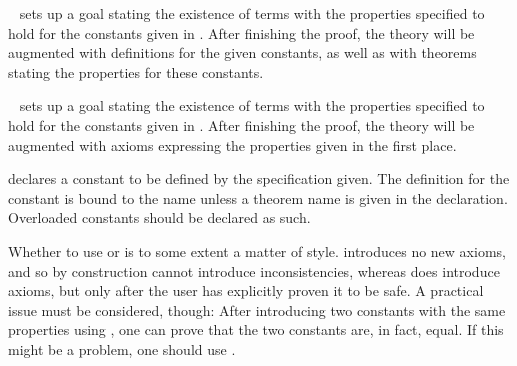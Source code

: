 \begin{isabellebody}
\begin{isamarkuptext}
\begin{description}
  \item \hyperlink{command.HOL.specification}{\mbox{}}~ sets up a
  goal stating the existence of terms with the properties specified to
  hold for the constants given in .  After finishing the
  proof, the theory will be augmented with definitions for the given
  constants, as well as with theorems stating the properties for these
  constants.

  \item \hyperlink{command.HOL.ax-specification}{\mbox{}}~ sets up
  a goal stating the existence of terms with the properties specified
  to hold for the constants given in .  After finishing
  the proof, the theory will be augmented with axioms expressing the
  properties given in the first place.

  \item {} declares a constant to be defined by the
  specification given.  The definition for the constant  is
  bound to the name  unless a theorem name is given in
  the declaration.  Overloaded constants should be declared as such.

  \end{description}

  Whether to use \hyperlink{command.HOL.specification}{\mbox{}} or \hyperlink{command.HOL.ax-specification}{\mbox{}} is to some extent a matter of style.  \hyperlink{command.HOL.specification}{\mbox{}} introduces no new axioms, and so by
  construction cannot introduce inconsistencies, whereas \hyperlink{command.HOL.ax-specification}{\mbox{}} does introduce axioms, but only after the
  user has explicitly proven it to be safe.  A practical issue must be
  considered, though: After introducing two constants with the same
  properties using \hyperlink{command.HOL.specification}{\mbox{}}, one can prove
  that the two constants are, in fact, equal.  If this might be a
  problem, one should use \hyperlink{command.HOL.ax-specification}{\mbox{}}.%
\end{isamarkuptext}%
\isamarkuptrue%
%
\isadelimtheory
%
\endisadelimtheory
%
\isatagtheory
{}\isamarkupfalse%
%
\endisatagtheory
{\isafoldtheory}%
%
\isadelimtheory
%
\endisadelimtheory
\isanewline
\end{isabellebody}%
